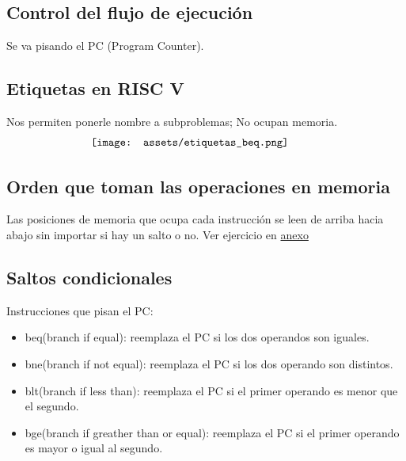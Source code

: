 \documentclass[10pt,a4paper]{article}
\begin{document}
\subsection*{Control del flujo de ejecución}
Se va pisando el PC (Program Counter). 

\subsection*{Etiquetas en RISC V}
Nos permiten ponerle nombre a subproblemas; No ocupan memoria.
\[\begin{minipage}[b]{0.6\textwidth}
    \texttt{[image: assets/etiquetas\_beq.png]}
    \label{fig:etiquetas_beq}
\end{minipage}\] 

\subsection*{Orden que toman las operaciones en memoria}
Las posiciones de memoria que ocupa cada instrucción se leen de arriba hacia abajo sin importar si hay un salto o no.
Ver ejercicio en \hyperref[subsec:TPRVC]{anexo} 
\subsection*{Saltos condicionales}
Instrucciones que pisan el PC: 
\begin{itemize}
    \item beq(branch if equal): reemplaza el PC si los dos operandos son iguales.
    \item bne(branch if not equal): reemplaza el PC si los dos operando son distintos.
    \item blt(branch if less than): reemplaza el PC si el primer operando es menor que el segundo.
    \item bge(branch if greather than or equal): reemplaza el PC si el primer operando es mayor o igual al segundo.
\end{itemize}
\end{document}
